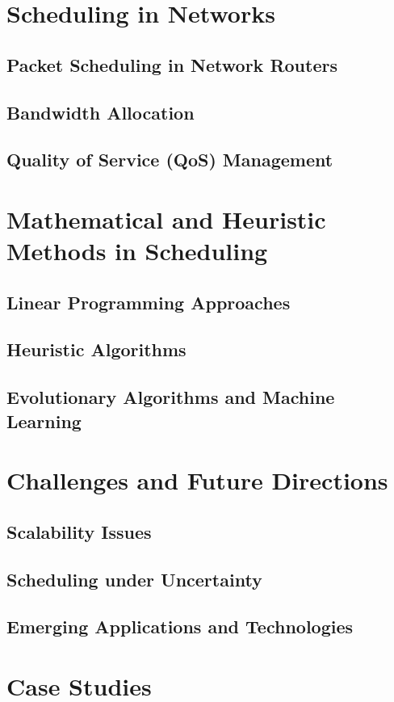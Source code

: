 \documentclass[12pt]{book} %
\begin{document}
\section{Scheduling in Networks}
\subsection{Packet Scheduling in Network Routers}
\subsection{Bandwidth Allocation}
\subsection{Quality of Service (QoS) Management}

\section{Mathematical and Heuristic Methods in Scheduling}
\subsection{Linear Programming Approaches}
\subsection{Heuristic Algorithms}
\subsection{Evolutionary Algorithms and Machine Learning}

\section{Challenges and Future Directions}
\subsection{Scalability Issues}
\subsection{Scheduling under Uncertainty}
\subsection{Emerging Applications and Technologies}

\section{Case Studies}
\end{document}
